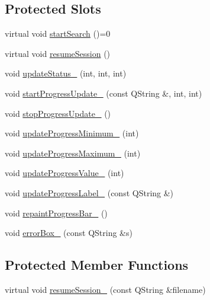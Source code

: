 \subsection*{Protected Slots}
\begin{DoxyCompactItemize}
\item 
virtual void \hyperlink{classGlobalSearch_1_1AbstractDialog_a40b7d250a73097f76edb2d77fce5482e}{start\-Search} ()=0
\item 
virtual void \hyperlink{classGlobalSearch_1_1AbstractDialog_a503a264e1a67559ace47d15d2c3aa61b}{resume\-Session} ()
\item 
void \hyperlink{classGlobalSearch_1_1AbstractDialog_ae5276198173f5a0da4a64adedc46f676}{update\-Status\-\_\-} (int, int, int)
\item 
void \hyperlink{classGlobalSearch_1_1AbstractDialog_a5370d90758c991200a233a78a1a51d16}{start\-Progress\-Update\-\_\-} (const Q\-String \&, int, int)
\item 
void \hyperlink{classGlobalSearch_1_1AbstractDialog_a5dd0aa68a9c1445965b9900290d4a507}{stop\-Progress\-Update\-\_\-} ()
\item 
void \hyperlink{classGlobalSearch_1_1AbstractDialog_a9013ffdb7bcec2ce4e6fec13fb0f1c0a}{update\-Progress\-Minimum\-\_\-} (int)
\item 
void \hyperlink{classGlobalSearch_1_1AbstractDialog_aa346e6c775c7edc9e423134ef8842c7b}{update\-Progress\-Maximum\-\_\-} (int)
\item 
void \hyperlink{classGlobalSearch_1_1AbstractDialog_af4c90078d59537ef9b9f7d69cbdc09c2}{update\-Progress\-Value\-\_\-} (int)
\item 
void \hyperlink{classGlobalSearch_1_1AbstractDialog_aff9811ebc7606ac13ae33b6130697fa9}{update\-Progress\-Label\-\_\-} (const Q\-String \&)
\item 
void \hyperlink{classGlobalSearch_1_1AbstractDialog_a455ad76e725fe59cd6f260d2c90d7a6d}{repaint\-Progress\-Bar\-\_\-} ()
\item 
void \hyperlink{classGlobalSearch_1_1AbstractDialog_a4ccf7b6a73663c780f82c2c6f4a39536}{error\-Box\-\_\-} (const Q\-String \&s)
\end{DoxyCompactItemize}
\subsection*{Protected Member Functions}
\begin{DoxyCompactItemize}
\item 
virtual void \hyperlink{classGlobalSearch_1_1AbstractDialog_a4ef7df380968131422757b20889d37b0}{resume\-Session\-\_\-} (const Q\-String \&filename)
\end{DoxyCompactItemize}
